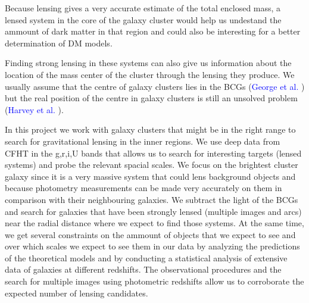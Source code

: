 Because lensing gives a very accurate estimate of the total enclosed mass, a lensed system in the core of the galaxy cluster would help us undestand the ammount of dark matter in that region and could also be interesting for a better determination of DM models.

Finding strong lensing in these systems can also give us information about the location of the mass center of the cluster through the lensing they produce. We usually assume that the centre of galaxy clusters lies in the BCGs (\textcolor{blue}{George et al.} \citeyear{Reference18}) but the real position of the centre in galaxy clusters is still an unsolved problem (\textcolor{blue}{Harvey et al.} \citeyear{Reference13}). 

In this project we work with galaxy clusters that might be in the right range to search for gravitational lensing in the inner regions. We use deep data from CFHT in the g,r,i,U bands that allows us to search for interesting targets (lensed systems) and probe the relevant spacial scales. We focus on the brightest cluster galaxy since it is a very massive system that could lens background objects and because photometry measurements can be made very accurately on them in comparison with their neighbouring galaxies. We subtract the light of the BCGs and search for galaxies that have been strongly lensed (multiple images and arcs) near the radial distance where we expect to find those systems. At the same time, we get several constraints on the ammount of objects that we expect to see and over which scales we expect to see them in our data by analyzing the predictions of the theoretical models and by conducting a statistical analysis of extensive data of galaxies at different redshifts. The observational procedures and the search for multiple images using photometric redshifts allow us to corroborate the expected number of lensing candidates.    

